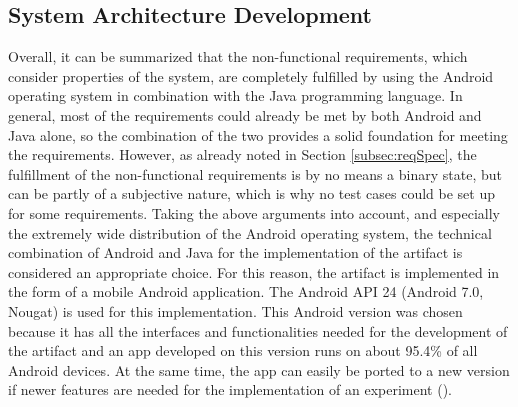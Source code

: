 \subsection{System Architecture Development}

Overall, it can be summarized that the non-functional requirements, which consider properties of the system, are completely fulfilled by using the Android operating system in combination with the Java programming language. In general, most of the requirements could already be met by both Android and Java alone, so the combination of the two provides a solid foundation for meeting the requirements. However, as already noted in Section \ref{subsec:reqSpec}, the fulfillment of the non-functional requirements is by no means a binary state, but can be partly of a subjective nature, which is why no test cases could be set up for some requirements. Taking the above arguments into account, and especially the extremely wide distribution of the Android operating system, the technical combination of Android and Java for the implementation of the artifact is considered an appropriate choice. 
For this reason, the artifact is implemented in the form of a mobile Android application. The Android API 24 (Android 7.0, Nougat) is used for this implementation. This Android version was chosen because it has all the interfaces and functionalities needed for the development of the artifact and an app developed on this version runs on about 95.4\% of all Android devices. At the same time, the app can easily be ported to a new version if newer features are needed for the implementation of an experiment (\cite{Google.2023}).

